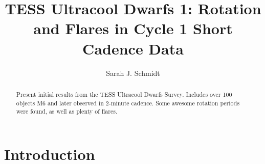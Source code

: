 \documentclass[twocolumn]{aastex62}
\begin{document}
\title{TESS Ultracool Dwarfs 1: Rotation and Flares in Cycle 1 Short Cadence Data}




\author[0000-0002-7224-7702]{Sarah J. Schmidt}
\nocollaboration





\begin{abstract}

Present initial results from the TESS Ultracool Dwarfs Survey. Includes over 100 objects M6 and later observed in 2-minute cadence. Some awesome rotation periods were found, as well as plenty of flares. 

\end{abstract}

\keywords{}

\section{Introduction} \label{sec:intro}
\end{document}
